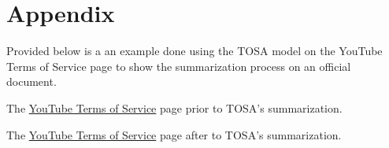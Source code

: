 \documentclass[sigconf, nonacm]{acmart}
\begin{document}




\section{Appendix}
Provided below is a an example done using the TOSA model on the YouTube Terms of Service page to show the summarization process on an official document.

The {\color{blue}\href{YouTube TOS.pdf}{YouTube Terms of Service}} page prior to TOSA's summarization.

The {\color{blue}\href{Simplified YouTube TOS.pdf}{YouTube Terms of Service}} page after to TOSA's summarization.
\end{document}
